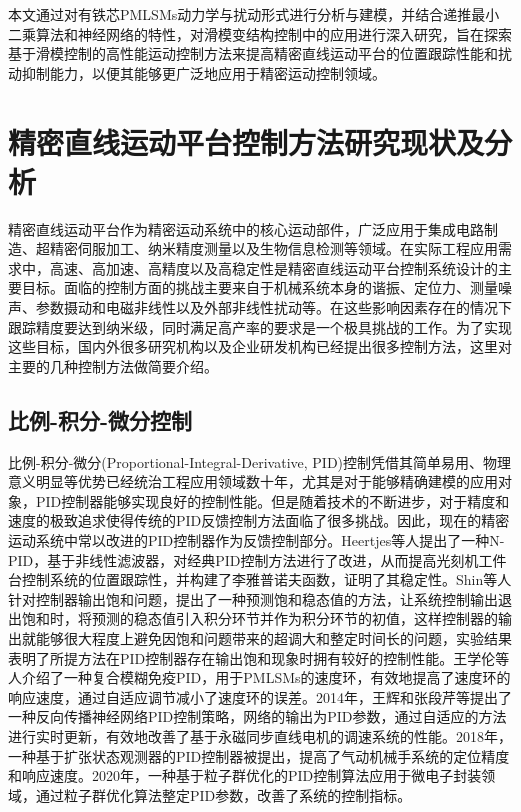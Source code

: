 本文通过对有铁芯PMLSMs动力学与扰动形式进行分析与建模，并结合递推最小二乘算法和神经网络的特性，对滑模变结构控制中的应用进行深入研究，旨在探索基于滑模控制的高性能运动控制方法来提高精密直线运动平台的位置跟踪性能和扰动抑制能力，以便其能够更广泛地应用于精密运动控制领域。
\section{精密直线运动平台控制方法研究现状及分析}
精密直线运动平台作为精密运动系统中的核心运动部件，广泛应用于集成电路制造、超精密伺服加工、纳米精度测量以及生物信息检测等领域\cite{董泽光2014精密气浮运动平台的建模}。在实际工程应用需求中，高速、高加速、高精度以及高稳定性是精密直线运动平台控制系统设计的主要目标。面临的控制方面的挑战主要来自于机械系统本身的谐振、定位力、测量噪声、参数摄动和电磁非线性以及外部非线性扰动等。在这些影响因素存在的情况下跟踪精度要达到纳米级，同时满足高产率的要求是一个极具挑战的工作。为了实现这些目标，国内外很多研究机构以及企业研发机构已经提出很多控制方法，这里对主要的几种控制方法做简要介绍。
\subsection{比例-积分-微分控制}
比例-积分-微分(Proportional-Integral-Derivative, PID)控制凭借其简单易用、物理意义明显等优势已经统治工程应用领域数十年，尤其是对于能够精确建模的应用对象，PID控制器能够实现良好的控制性能。但是随着技术的不断进步，对于精度和速度的极致追求使得传统的PID反馈控制方法面临了很多挑战。因此，现在的精密运动系统中常以改进的PID控制器作为反馈控制部分。Heertjes等人\cite{2009Performance}提出了一种N-PID，基于非线性滤波器，对经典PID控制方法进行了改进，从而提高光刻机工件台控制系统的位置跟踪性，并构建了李雅普诺夫函数，证明了其稳定性。Shin等人\cite{2011Anti}针对控制器输出饱和问题，提出了一种预测饱和稳态值的方法，让系统控制输出退出饱和时，将预测的稳态值引入积分环节并作为积分环节的初值，这样控制器的输出就能够很大程度上避免因饱和问题带来的超调大和整定时间长的问题，实验结果表明了所提方法在PID控制器存在输出饱和现象时拥有较好的控制性能。王学伦等人\cite{wang2011design}介绍了一种复合模糊免疫PID，用于PMLSMs的速度环，有效地提高了速度环的响应速度，通过自适应调节减小了速度环的误差。2014年，王辉和张段芹等\cite{王辉2014新型智能}提出了一种反向传播神经网络PID控制策略，网络的输出为PID参数，通过自适应的方法进行实时更新，有效地改善了基于永磁同步直线电机的调速系统的性能。2018年，一种基于扩张状态观测器的PID控制器被提出\cite{王文深2018基于}，提高了气动机械手系统的定位精度和响应速度。2020年，一种基于粒子群优化的PID控制算法应用于微电子封装领域\cite{2020A}，通过粒子群优化算法整定PID参数，改善了系统的控制指标。


